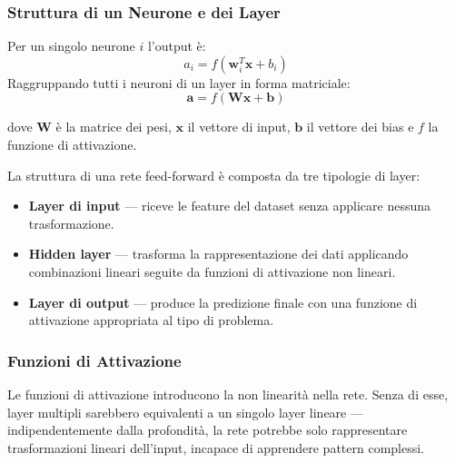 \documentclass[12pt, a4paper]{article}
\begin{document}
\subsubsection{Struttura di un Neurone e dei Layer}

Per un singolo neurone $i$ l'output è:
\begin{equation}
    a_i = f\!\left(\mathbf{w}_i^T \mathbf{x} + b_i\right)
\end{equation}
Raggruppando tutti i neuroni di un layer in forma matriciale:
\begin{equation}
    \mathbf{a} = f\!\left(\mathbf{W}\mathbf{x} + \mathbf{b}\right)
\end{equation}

dove $\mathbf{W}$ è la matrice dei pesi, $\mathbf{x}$ il vettore di input,
$\mathbf{b}$ il vettore dei bias e $f$ la funzione di attivazione.

La struttura di una rete feed-forward è composta da tre tipologie di layer:

\begin{itemize}
    \item \textbf{Layer di input} --- riceve le feature del dataset senza
          applicare nessuna trasformazione.
    \item \textbf{Hidden layer} --- trasforma la rappresentazione dei dati
          applicando combinazioni lineari seguite da funzioni di attivazione
          non lineari.
    \item \textbf{Layer di output} --- produce la predizione finale con una
          funzione di attivazione appropriata al tipo di problema.
\end{itemize}

\subsubsection{Funzioni di Attivazione}

Le funzioni di attivazione introducono la non linearità nella rete. Senza di
esse, layer multipli sarebbero equivalenti a un singolo layer lineare ---
indipendentemente dalla profondità, la rete potrebbe solo rappresentare
trasformazioni lineari dell'input, incapace di apprendere pattern complessi.
\end{document}

